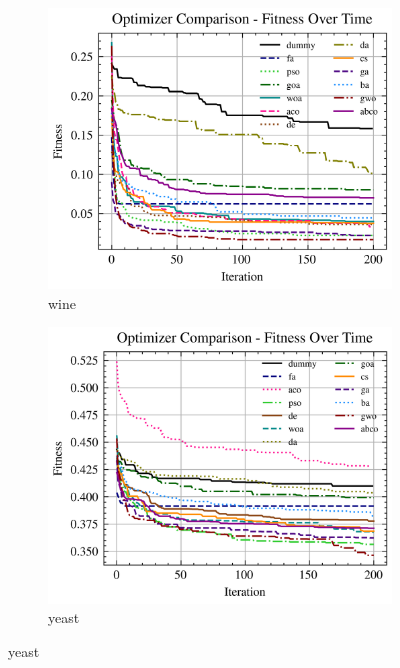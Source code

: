 \begin{figure}[htp]
    \begin{subfigure}[htp]{0.45\textwidth}
        \includegraphics[width=\textwidth]{imagenes/fitness_charts/img/binary/wine/optimizers_fitness_svc.png}
        \caption{wine}
        \label{fig:convergencia_wine_svc}
    \end{subfigure}
    \begin{subfigure}[htp]{0.45\textwidth}
        \includegraphics[width=\textwidth]{imagenes/fitness_charts/img/binary/yeast/optimizers_fitness_svc.png}
        \caption{yeast}
        \label{fig:convergencia_yeast_svc}
    \end{subfigure}


\end{figure}
